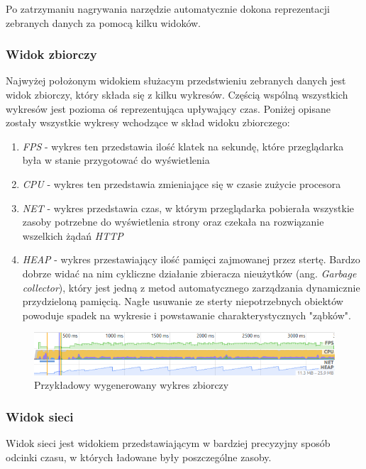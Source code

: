 \documentclass[polish, twoside, 12pt]{mwart}
\begin{document}
Po zatrzymaniu nagrywania narzędzie automatycznie dokona reprezentacji zebranych danych za pomocą kilku widoków.

\subsubsection{Widok zbiorczy}

Najwyżej położonym widokiem służacym przedstwieniu zebranych danych jest widok zbiorczy, który składa się z kilku wykresów. Częścią wspólną wszystkich wykresów jest pozioma oś reprezentująca upływający czas. Poniżej opisane zostały wszystkie wykresy wchodzące w skład widoku zbiorczego:

\begin{enumerate}
  \item \emph{FPS} - wykres ten przedstawia ilość klatek na sekundę, które przeglądarka była w stanie przygotować do wyświetlenia
  \item \emph{CPU} - wykres ten przedstawia zmieniające się w czasie zużycie procesora
  \item \emph{NET} - wykres przedstawia czas, w którym przeglądarka pobierała wszystkie zasoby potrzebne do wyświetlenia strony oraz czekała na rozwiązanie wszelkich żądań \emph{HTTP}
  \item \emph{HEAP} - wykres przestawiający ilość pamięci zajmowanej przez stertę. Bardzo dobrze widać na nim cykliczne działanie zbieracza nieużytków (ang. \emph{Garbage collector}), który jest jedną z metod automatycznego zarządzania dynamicznie przydzieloną pamięcią. Nagłe usuwanie ze sterty niepotrzebnych obiektów powoduje spadek na wykresie i powstawanie charakterystycznych "ząbków".
\end{enumerate}

\begin{figure}[ht]
  \includegraphics[width=\textwidth]{chrome-devtools-performance-summary-view.png}
	\caption{Przykładowy wygenerowany wykres zbiorczy}
\end{figure}

\subsubsection{Widok sieci}

Widok sieci jest widokiem przedstawiającym w bardziej precyzyjny sposób odcinki czasu, w których ładowane były poszczególne zasoby.
\end{document}
